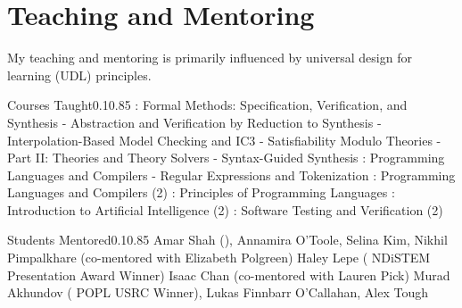 \documentclass{federico_cv}
\begin{document}
\section{Teaching and Mentoring}

My teaching and mentoring is primarily influenced by universal design for
learning (UDL) principles.


\begin{tblSubSection}{Courses Taught}{0.1}{0.85}
{: Formal Methods: Specification, Verification, and Synthesis}
{\quad - Abstraction and Verification by Reduction to Synthesis} 
{\quad - Interpolation-Based Model Checking and IC3}
{\quad - Satisfiability Modulo Theories - Part II: Theories and Theory Solvers}
{\quad - Syntax-Guided Synthesis} 
{: Programming Languages and Compilers}
{\quad - Regular Expressions and Tokenization}
{: Programming Languages and Compilers (2)}
{: Principles of Programming Languages} 
{: Introduction to Artificial Intelligence (2)}
{: Software Testing and Verification (2)}
\end{tblSubSection}

\begin{tblSubSection}{Students Mentored}{0.1}{0.85}
{Amar Shah (),
Annamira O'Toole, Selina Kim, Nikhil Pimpalkhare (co-mentored with Elizabeth Polgreen)}
{Haley Lepe
(
{NDiSTEM  Presentation Award Winner})}
{Isaac Chan (co-mentored with Lauren Pick)}
{Murad Akhundov
(
{POPL  USRC Winner}), Lukas Finnbarr O'Callahan, Alex Tough}
\end{tblSubSection}
\end{document}
